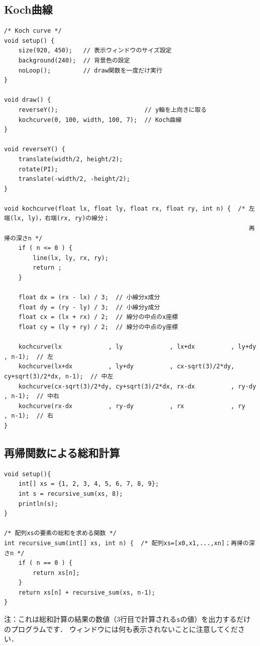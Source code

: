 \documentclass[dvipdfmx]{jsarticle}
\theoremstyle{definition}
\begin{document}
\subsection{Koch曲線}  \label{subsec_code_koch_curve}
\begin{lstlisting}[caption=Koch曲線, label=code_koch_curve_all]
/* Koch curve */
void setup() {
    size(920, 450);   // 表示ウィンドウのサイズ設定
    background(240);  // 背景色の設定
    noLoop();         // draw関数を一度だけ実行
}

void draw() {
    reverseY();                        // y軸を上向きに取る
    kochcurve(0, 100, width, 100, 7);  // Koch曲線
}

void reverseY() {
    translate(width/2, height/2);
    rotate(PI);
    translate(-width/2, -height/2);
}

void kochcurve(float lx, float ly, float rx, float ry, int n) {  /* 左端(lx, ly)，右端(rx, ry)の線分；
                                                                    再帰の深さn */
    if ( n <= 0 ) {
        line(lx, ly, rx, ry);
        return ;
    }

    float dx = (rx - lx) / 3;  // 小線分x成分
    float dy = (ry - ly) / 3;  // 小線分y成分
    float cx = (lx + rx) / 2;  // 線分の中点のx座標
    float cy = (ly + ry) / 2;  // 線分の中点のy座標

    kochcurve(lx             , ly             , lx+dx          , ly+dy          , n-1);  // 左
    kochcurve(lx+dx          , ly+dy          , cx-sqrt(3)/2*dy, cy+sqrt(3)/2*dx, n-1);  // 中左
    kochcurve(cx-sqrt(3)/2*dy, cy+sqrt(3)/2*dx, rx-dx          , ry-dy          , n-1);  // 中右
    kochcurve(rx-dx          , ry-dy          , rx             , ry             , n-1);  // 右
}
\end{lstlisting}
\clearpage

\subsection{再帰関数による総和計算}  \label{subsec_code_recursive_sum}
\begin{lstlisting}[caption=再帰関数による総和計算, label=code_recursive_sum_all]
void setup(){
    int[] xs = {1, 2, 3, 4, 5, 6, 7, 8, 9};
    int s = recursive_sum(xs, 8);
    println(s);
}

/* 配列xsの要素の総和を求める関数 */
int recursive_sum(int[] xs, int n) {  /* 配列xs=[x0,x1,...,xn]；再帰の深さn */
    if ( n == 0 ) {
        return xs[n];
    }
    return xs[n] + recursive_sum(xs, n-1);
}
\end{lstlisting}
注：これは総和計算の結果の数値（3行目で計算される\verb|s|の値）を出力するだけのプログラムです．
ウィンドウには何も表示されないことに注意してください．
\clearpage
\end{document}
